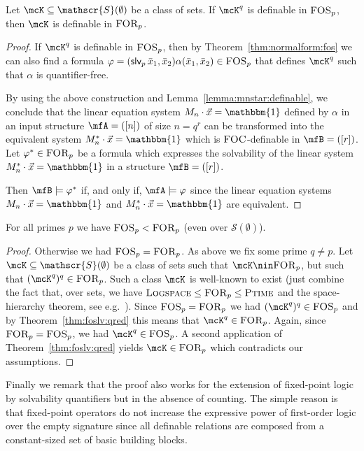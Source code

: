 \documentclass[a4paper,UKenglish]{lipics}
\newcommand{\inseg}[1]{\ensuremath{[#1]}}
\newcommand{\onevec}{\ensuremath{\mathbbm{1}}}
\newcommand{\Str}{\ensuremath{\mathscr{S}}}
\newcommand{\logic}[1]{\ensuremath{\textsc{#1}}\xspace}
\newcommand{\FOC}{\logic{FOC}}
\newcommand{\FOSp}{\ensuremath{\logic{FOS}_p}\xspace}
\newcommand{\FORp}{\ensuremath{\logic{FOR}_p}\xspace}
\newcommand{\slvp}{\ensuremath{\textsf{slv}_p}\xspace}
\newcommand{\compclass}[1]{\ensuremath{\textsc{#1}}\xspace}
\newcommand{\PTIME}{\compclass{Ptime}}
\renewcommand{\phi}{\varphi}
\newcommand{\bx}{{\bar x}}
\newcommand{\complexityclass}[1]{\ensuremath{\textsc{#1}}\xspace}
\newcommand{\LOGSPACE}{\complexityclass{Logspace}}
\theoremstyle{plain}
\begin{document}
\begin{theorem}
\label{thm:foslv:qred}
 Let $\mcK \subseteq \Str(\emptyset)$ be a class of sets. If $\mcK^q$ is 
definable in $\FOSp$, then 
$\mcK$ is definable in $\FORp$.
\end{theorem}
\begin{proof}
 If $\mcK^q$ is definable in $\FOSp$, then by 
Theorem~\ref{thm:normalform:fos} we can also find a formula $\phi  = 
(\slvp \, \bx_1,\bx_2) \alpha(\bx_1,\bx_2) \in 
\FOSp$ 
that defines $\mcK^q$ such that 
$\alpha$ is quantifier-free. 

By using the above construction and Lemma~\ref{lemma:mnstar:definable}, 
we conclude that the linear equation system $M_n \cdot \vec x = \onevec$ 
defined by $\alpha$ in an input structure $\mfA = (\inseg n)$ of size 
$n = q^r$ can be transformed into the equivalent 
system $M_n^* \cdot \vec x = \onevec$ which is $\FOC$-definable in $\mfB = 
( \inseg r)$.
Let $\phi^* \in \FORp$ be a formula which expresses the solvability of 
the linear system $M_n^* \cdot \vec x = \onevec$ in a structure $\mfB = 
(\inseg r)$.

Then $\mfB \models \phi^*$ if, and only if, $\mfA \models \phi$ since the 
linear equation systems $M_n \cdot \vec x = \onevec$ 
and $M_n^* \cdot \vec x = \onevec$ are equivalent.
\end{proof}


\begin{theorem}
 For all primes $p$ we have 
 $\FOSp < \FORp$ (even over $\Str(\emptyset)$).
\end{theorem}
\begin{proof}
 Otherwise we had $\FOSp = \FORp$. As above we fix some prime $q \neq p$. 
Let $\mcK \subseteq \Str(\emptyset)$ be a class of sets such that $\mcK 
\nin \FORp$, but such that $(\mcK^q)^q \in \FORp$. Such a class $\mcK$ is 
well-known to exist (just combine the fact that, over sets, we have 
$\LOGSPACE \leq \FORp \leq \PTIME$ and the space-hierarchy 
theorem, see e.g.~\cite{Pa95}). Since $\FOSp = \FORp$ we had $(\mcK^q)^q 
\in 
\FOSp$ and by Theorem~\ref{thm:foslv:qred} this means that $\mcK^q \in 
\FORp$. Again, since $\FORp = \FOSp$, we had $\mcK^q \in \FOSp$. A second 
application of Theorem~\ref{thm:foslv:qred} yields $\mcK \in \FORp$ 
which contradicts our assumptions.
\end{proof}

Finally we remark that the proof also works for the extension of 
fixed-point logic by solvability quantifiers but in the absence of counting.
The simple reason is that fixed-point operators do not increase the expressive 
power of first-order logic over the empty signature since all definable 
relations are composed from a constant-sized set of basic building blocks. 
\end{document}
